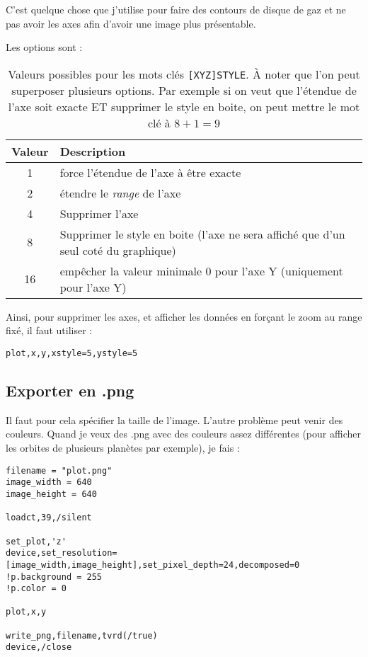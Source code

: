 \documentclass[a4paper,twoside]{article}
\begin{document}
C'est quelque chose que j'utilise pour faire des contours de disque de gaz et ne pas avoir les axes afin d'avoir une image plus présentable.

Les options sont :
\begin{table}[htb]
\centering
\begin{center}
\begin{tabular}{|c|p{5cm}|}\hline
Valeur & Description\\\hline
1 & force l'étendue de l'axe à être exacte\\\hline
2 & étendre le \emph{range} de l'axe\\\hline
4 & Supprimer l'axe\\\hline
8 & Supprimer le style en boite (l'axe ne sera affiché que d'un seul coté du graphique)\\\hline
16 & empêcher la valeur minimale 0 pour l'axe Y (uniquement pour l'axe Y)\\\hline
\end{tabular}
\end{center}

\caption{Valeurs possibles pour les mots clés \texttt{[XYZ]STYLE}. À noter que l'on peut superposer plusieurs options. Par exemple si on veut que l'étendue de l'axe soit exacte ET supprimer le style en boite, on peut mettre le mot clé à $8+1=9$}
\end{table}

\begin{remarque}
Ainsi, pour supprimer les axes, et afficher les données en forçant le zoom au range fixé, il faut utiliser : 
\begin{lstlisting}[language=IDL]
plot,x,y,xstyle=5,ystyle=5
\end{lstlisting}
\end{remarque}


\subsection{Exporter en .png}
Il faut pour cela spécifier la taille de l'image. L'autre problème peut venir des couleurs. Quand je veux des .png avec des couleurs assez différentes (pour afficher les orbites de plusieurs planètes par exemple), je fais :
\begin{lstlisting}[language=IDL]
filename = "plot.png"
image_width = 640
image_height = 640

loadct,39,/silent

set_plot,'z'
device,set_resolution=[image_width,image_height],set_pixel_depth=24,decomposed=0
!p.background = 255
!p.color = 0

plot,x,y

write_png,filename,tvrd(/true)
device,/close
\end{lstlisting}
\end{document}

